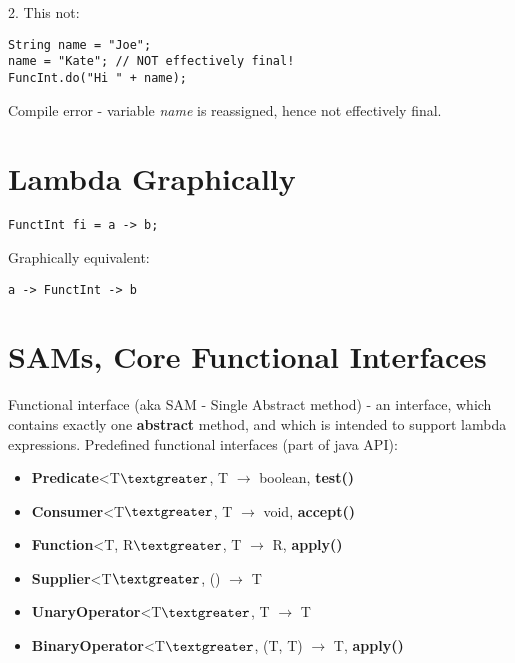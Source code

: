 \documentclass{report}
\begin{document}
2. This not:
\begin{verbatim}
String name = "Joe";
name = "Kate"; // NOT effectively final!
FuncInt.do("Hi " + name);
\end{verbatim}
Compile error - variable \textit{name} is reassigned, hence not effectively final.

\section{Lambda Graphically}
\begin{verbatim}
FunctInt fi = a -> b;
\end{verbatim}

Graphically equivalent:
\begin{verbatim}
a -> FunctInt -> b
\end{verbatim}

\section{SAMs, Core Functional Interfaces}

Functional interface (aka SAM - Single Abstract method) - an interface, which contains exactly one \textbf{abstract} method, and which is intended to support lambda expressions. Predefined functional interfaces (part of java API):
\begin{itemize}
	\item \textbf{Predicate}\textless T$\textgreater$, T  $\rightarrow$ boolean, \textbf{test()}
	\item \textbf{Consumer}\textless T$\textgreater$, T  $\rightarrow$ void, \textbf{accept()}
	\item \textbf{Function}\textless T, R$\textgreater$, T $\rightarrow$ R, \textbf{apply()}
	\item \textbf{Supplier}\textless T$\textgreater$, () $\rightarrow$ T
	\item \textbf{UnaryOperator}\textless T$\textgreater$, T $\rightarrow$ T
	\item  \textbf{BinaryOperator}\textless T$\textgreater$, (T, T)  $\rightarrow$ T, \textbf{apply()}
\end{itemize}
\end{document}
